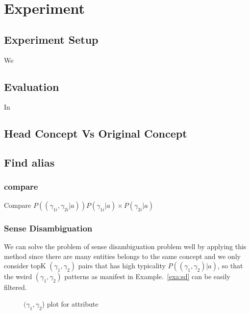 \section{Experiment}

\subsection{Experiment Setup}

We

\subsection{Evaluation}
In


\subsection{Head Concept Vs Original Concept}

\subsection{Find alias}
\subsubsection{compare}

Compare $ P((\gamma_{1i},\gamma_{2i} |a ))P(\gamma_{1i}|a) \times P(\gamma_{2i}|a)$




\subsubsection{Sense Disambiguation}

We can solve the problem of sense disambiguation problem well by applying this method since there are many entities belongs to the same concept and we only consider topK $(\gamma_1,\gamma_2)$ pairs that has high typicality $P( (\gamma_1,\gamma_2) |a)$, so that the weird $(\gamma_1,\gamma_2)$ patterns as manifest in Example.~\ref{exa:sd} can be easily filtered.


\begin{figure}[!htb]
\centering {}
\caption{$(\gamma_1,\gamma_2$) plot for attribute } \label{fig:evplot}
\end{figure}

